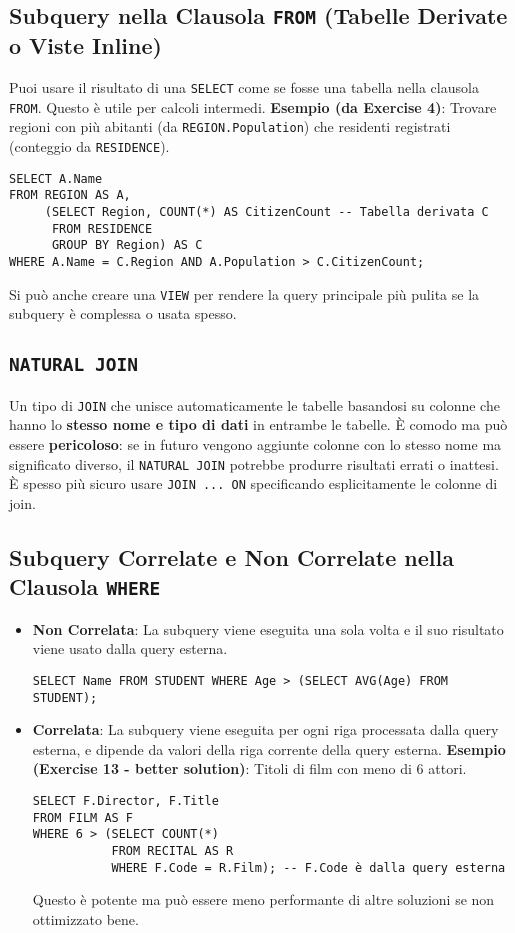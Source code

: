 \subsection{Subquery nella Clausola \texttt{FROM} (Tabelle Derivate o Viste Inline)}
Puoi usare il risultato di una \texttt{SELECT} come se fosse una tabella nella clausola \texttt{FROM}. Questo è utile per calcoli intermedi.
\textbf{Esempio (da Exercise 4)}: Trovare regioni con più abitanti (da \texttt{REGION.Population}) che residenti registrati (conteggio da \texttt{RESIDENCE}).
\begin{verbatim}
SELECT A.Name
FROM REGION AS A,
     (SELECT Region, COUNT(*) AS CitizenCount -- Tabella derivata C
      FROM RESIDENCE
      GROUP BY Region) AS C
WHERE A.Name = C.Region AND A.Population > C.CitizenCount;
\end{verbatim}
Si può anche creare una \texttt{VIEW} per rendere la query principale più pulita se la subquery è complessa o usata spesso.

\subsection{\texttt{NATURAL JOIN}}
Un tipo di \texttt{JOIN} che unisce automaticamente le tabelle basandosi su colonne che hanno lo \textbf{stesso nome e tipo di dati} in entrambe le tabelle.
È comodo ma può essere \textbf{pericoloso}: se in futuro vengono aggiunte colonne con lo stesso nome ma significato diverso, il \texttt{NATURAL JOIN} potrebbe produrre risultati errati o inattesi. È spesso più sicuro usare \texttt{JOIN ... ON} specificando esplicitamente le colonne di join.

\subsection{Subquery Correlate e Non Correlate nella Clausola \texttt{WHERE}}
\begin{itemize}
    \item \textbf{Non Correlata}: La subquery viene eseguita una sola volta e il suo risultato viene usato dalla query esterna.
    \begin{verbatim}
SELECT Name FROM STUDENT WHERE Age > (SELECT AVG(Age) FROM STUDENT);
    \end{verbatim}
    \item \textbf{Correlata}: La subquery viene eseguita per ogni riga processata dalla query esterna, e dipende da valori della riga corrente della query esterna.
    \textbf{Esempio (Exercise 13 - better solution)}: Titoli di film con meno di 6 attori.
    \begin{verbatim}
SELECT F.Director, F.Title
FROM FILM AS F
WHERE 6 > (SELECT COUNT(*)
           FROM RECITAL AS R
           WHERE F.Code = R.Film); -- F.Code è dalla query esterna
    \end{verbatim}
    Questo è potente ma può essere meno performante di altre soluzioni se non ottimizzato bene.
\end{itemize}

